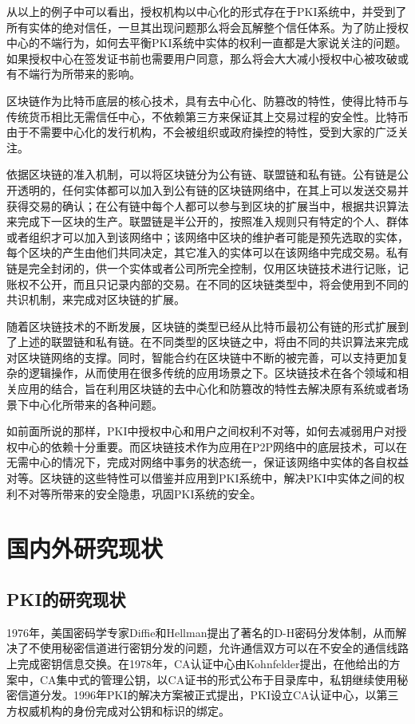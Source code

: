 从以上的例子中可以看出，授权机构以中心化的形式存在于PKI系统中，并受到了所有实体的绝对信任，一旦其出现问题那么将会瓦解整个信任体系。为了防止授权中心的不端行为，如何去平衡PKI系统中实体的权利一直都是大家说关注的问题。如果授权中心在签发证书前也需要用户同意，那么将会大大减小授权中心被攻破或有不端行为所带来的影响。

区块链作为比特币底层的核心技术，具有去中心化、防篡改的特性，使得比特币与传统货币相比无需信任中心，不依赖第三方来保证其上交易过程的安全性。比特币由于不需要中心化的发行机构，不会被组织或政府操控的特性，受到大家的广泛关注。

依据区块链的准入机制，可以将区块链分为公有链、联盟链和私有链。公有链是公开透明的，任何实体都可以加入到公有链的区块链网络中，在其上可以发送交易并获得交易的确认；在公有链中每个人都可以参与到区块的扩展当中，根据共识算法来完成下一区块的生产。联盟链是半公开的，按照准入规则只有特定的个人、群体或者组织才可以加入到该网络中；该网络中区块的维护者可能是预先选取的实体，每个区块的产生由他们共同决定，其它准入的实体可以在该网络中完成交易。私有链是完全封闭的，供一个实体或者公司所完全控制，仅用区块链技术进行记账，记账权不公开，而且只记录内部的交易。在不同的区块链类型中，将会使用到不同的共识机制，来完成对区块链的扩展。


随着区块链技术的不断发展，区块链的类型已经从比特币最初公有链的形式扩展到了上述的联盟链和私有链。在不同类型的区块链之中，将由不同的共识算法来完成对区块链网络的支撑。同时，智能合约在区块链中不断的被完善，可以支持更加复杂的逻辑操作，从而使用在很多传统的应用场景之下。区块链技术在各个领域和相关应用的结合，旨在利用区块链的去中心化和防篡改的特性去解决原有系统或者场景下中心化所带来的各种问题。


如前面所说的那样，PKI中授权中心和用户之间权利不对等，如何去减弱用户对授权中心的依赖十分重要。而区块链技术作为应用在P2P网络中的底层技术，可以在无需中心的情况下，完成对网络中事务的状态统一，保证该网络中实体的各自权益对等。区块链的这些特性可以借鉴并应用到PKI系统中，解决PKI中实体之间的权利不对等所带来的安全隐患，巩固PKI系统的安全。


\section{国内外研究现状}

\subsection{PKI的研究现状}

1976年，美国密码学专家Diffie和Hellman提出了著名的D-H密码分发体制，从而解决了不使用秘密信道进行密钥分发的问题，允许通信双方可以在不安全的通信线路上完成密钥信息交换。在1978年，CA认证中心由Kohnfelder提出，在他给出的方案中，CA集中式的管理公钥，以CA证书的形式公布于目录库中，私钥继续使用秘密信道分发。1996年PKI的解决方案被正式提出，PKI设立CA认证中心，以第三方权威机构的身份完成对公钥和标识的绑定。

